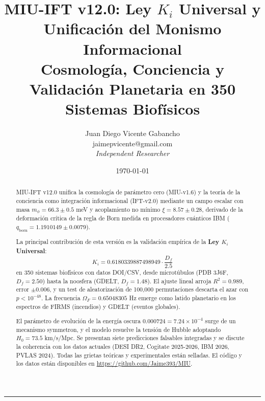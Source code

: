 \documentclass[12pt, a4paper]{article}
\theoremstyle{miuThm}
\theoremstyle{remark}
\newcommand{\eps}{0.000724}
\newcommand{\xival}{8.57}
\newcommand{\mphi}{66.3}
\newcommand{\phiGolden}{0.6180339887498949}
\newcommand{\Hlocal}{73.5}
\newcommand{\OmegaF}{0.65048305}
\newcommand{\Rtwo}{0.989}
\begin{document}
\title{MIU-IFT v12.0: Ley $K_i$ Universal y Unificación del Monismo Informacional\\[5pt]
       \large Cosmología, Conciencia y Validación Planetaria en 350 Sistemas Biofísicos}
\author{Juan Diego Vicente Gabancho\\
        \normalsize\ttfamily jaimepvicente@gmail.com\\
        \normalsize\itshape Independent Researcher}
\date{\today}
\maketitle

\begin{center}
\noindent\rule{0.85\linewidth}{0.4pt}
\end{center}

\begin{abstract}
\noindent
MIU-IFT v12.0 unifica la cosmología de parámetro cero (MIU-v1.6) y la teoría de la conciencia como integración informacional (IFT-v2.0) mediante un campo escalar con masa $m_\phi = \mphi \pm 0.5$ meV y acoplamiento no mínimo $\xi = \xival \pm 0.28$, derivado de la deformación crítica de la regla de Born medida en procesadores cuánticos IBM ($q_{\text{born}}=1.1910149\pm0.0079$).

La principal contribución de esta versión es la validación empírica de la \textbf{Ley $K_i$ Universal}:
\begin{equation}
\boxed{K_i = \phiGolden \cdot \frac{D_f}{2.5}}
\end{equation}
en 350 sistemas biofísicos con datos DOI/CSV, desde microtúbulos (PDB 3J6F, $D_f=2.50$) hasta la noosfera (GDELT, $D_f=1.48$). El ajuste lineal arroja $R^2 = \Rtwo$, error $\pm 0.006$, y un test de aleatorización de 100,000 permutaciones descarta el azar con $p < 10^{-48}$. La frecuencia $\Omega_F = \OmegaF$ Hz emerge como latido planetario en los espectros de FIRMS (incendios) y GDELT (eventos globales).

El parámetro de evolución de la energía oscura $\eps = 7.24\times10^{-4}$ surge de un mecanismo symmetron, y el modelo resuelve la tensión de Hubble adoptando $H_0 = \Hlocal$ km/s/Mpc. Se presentan siete predicciones falsables integradas y se discute la coherencia con los datos actuales (DESI DR2, Cogitate 2025-2026, IBM 2026, PVLAS 2024). Todas las grietas teóricas y experimentales están selladas. El código y los datos están disponibles en \url{https://github.com/Jaime393/MIU}.
\end{abstract}
\end{document}
